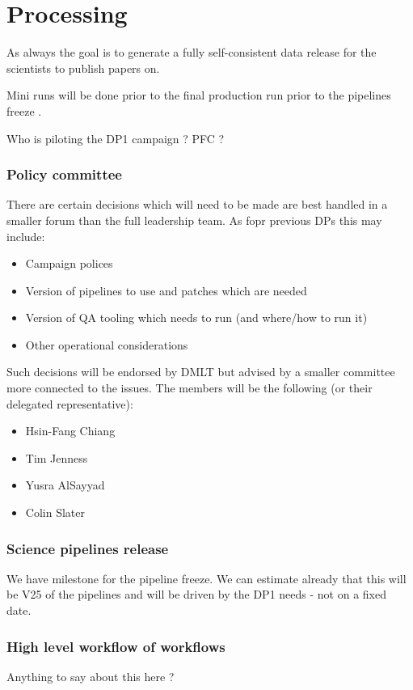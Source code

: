 \section{Processing} \label{sec:proc}

As always the goal is to generate a fully self-consistent data release for the scientists to publish papers on.

Mini runs will be done prior to the final production run prior to the pipelines freeze .


Who is piloting the DP1 campaign ? PFC ?


\subsubsection {Policy committee} \label{sec:policy}

There are certain decisions which will need to be made are best handled in a smaller forum than the full leadership team.
As fopr previous DPs this may include:

\begin{itemize}
\item Campaign polices
\item Version of pipelines to use and patches which are needed
\item Version of QA tooling which needs to run (and where/how to run it)
\item Other operational considerations
\end{itemize}

Such decisions will be endorsed by DMLT but advised by a smaller committee more connected to the issues.
The members will be the following (or their delegated representative):

\begin{itemize}
\item Hsin-Fang Chiang
\item Tim Jenness
\item Yusra AlSayyad
\item Colin Slater
\end{itemize}


\subsubsection {Science pipelines release} \label{sec:release}
We have milestone  for the pipeline freeze.
We can estimate already that this will be V25 of the pipelines and will be driven by the DP1 needs - not on a fixed date.

\subsubsection {High level workflow of workflows}
Anything to say about this here ?

